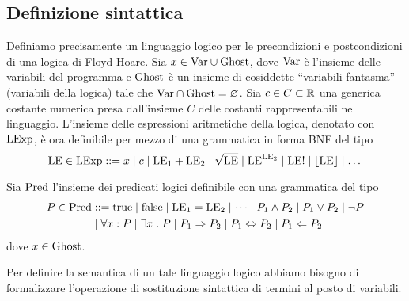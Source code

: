 \subsection{Definizione sintattica}

Definiamo precisamente un linguaggio logico per le
precondizioni e postcondizioni di una logica di Floyd-Hoare.
Sia $x \in \mathrm{Var} \cup \mathrm{Ghost}$, dove $\mathrm{Var}$ è l'insieme delle variabili del
programma e $\mathrm{Ghost}$ è un insieme di cosiddette ``variabili fantasma''
(variabili della logica) tale che $\mathrm{Var} \cap \mathrm{Ghost} = \varnothing$.
Sia $c \in C \subset \mathbb{R}$ una generica costante numerica presa dall'insieme
$C$ delle costanti rappresentabili nel linguaggio.
L'insieme delle espressioni aritmetiche della logica, denotato con $\mathrm{LExp}$,
è ora definibile per mezzo di una grammatica in forma BNF del tipo
\[
  \mathrm{LE} \in \mathrm{LExp} ::= x
                \mathrel{\mid} c
                \mathrel{\mid} \mathrm{LE}_1 + \mathrm{LE}_2
                \mathrel{\mid} \sqrt{\mathrm{LE}}
                \mathrel{\mid} \mathrm{LE}^{\mathrm{LE}_2}
                \mathrel{\mid} \mathrm{LE}!
                \mathrel{\mid} \lfloor \mathrm{LE} \rfloor
                \mathrel{\mid} \dots
\]

Sia $\mathrm{Pred}$ l'insieme dei predicati logici definibile con una grammatica
del tipo
\begin{align*}
P \in \Pred &::= \true
            \vbar \false
            \vbar\LE_1 = \LE_2
            \vbar \dots
            \vbar P_1 \land P_2
            \vbar P_1 \lor P_2
            \vbar \neg P \\
            &\vbar \forall x \itc P
            \vbar \exists x \st P
            \vbar P_1 \Rightarrow P_2
            \vbar P_1 \Leftrightarrow P_2 \vbar P_1 \Leftarrow P_2
\end{align*}
dove $x \in\mathrm{Ghost}$.

Per definire la semantica di un tale linguaggio logico abbiamo bisogno
di formalizzare l'operazione di sostituzione sintattica di termini
al posto di variabili.

